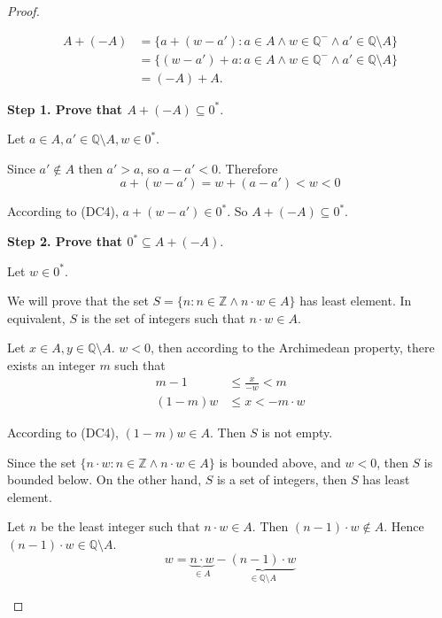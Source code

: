 \begin{proof}
\begin{enumerate}[label = (F\arabic*)]
\begin{align*}
                  A + (-A) & = \{ a + (w - a') : a\in A\land w\in\mathbb{Q}^{-}\land a'\in\mathbb{Q}\setminus A \} \\
                           & = \{ (w - a') + a : a\in A\land w\in\mathbb{Q}^{-}\land a'\in\mathbb{Q}\setminus A \} \\
                           & = (-A) + A.
              \end{align*}
              \par \textbf{Step 1. Prove that $A + (-A)\subseteq {0}^{*}$}.
              \par Let $a\in A, a'\in \mathbb{Q}\setminus A, w\in {0}^{*}$.
              \par Since $a'\notin A$ then $a' > a$, so $a - a' < 0$. Therefore
              \[
                  a + (w - a') = w + (a - a') < w < 0
              \]
              \par According to (DC4), $a + (w - a')\in {0}^{*}$. So $A + (-A) \subseteq {0}^{*}$.
              \bigskip
              \par \textbf{Step 2. Prove that ${0}^{*}\subseteq A + (-A)$}.
              \par Let $w\in {0}^{*}$.
              \par We will prove that the set $S = \{ n : n\in\mathbb{Z} \land n\cdot w\in A \}$ has least element. In equivalent, $S$ is the set of integers such that $n\cdot w\in A$.
              \par Let $x\in A, y\in\mathbb{Q}\setminus A$. $w < 0$, then according to the Archimedean property, there exists an integer $m$ such that
              \begin{align*}
                  m - 1    & \le \frac{x}{-w} < m \\
                  (1 - m)w & \le x < -m\cdot w
              \end{align*}
              \par According to (DC4), $(1 - m)w\in A$. Then $S$ is not empty.
              \par Since the set $\{ n\cdot w : n\in\mathbb{Z}\land n\cdot w\in A \}$ is bounded above, and $w < 0$, then $S$ is bounded below. On the other hand, $S$ is a set of integers, then $S$ has least element.
              \par
              \par Let $n$ be the least integer such that $n\cdot w\in A$. Then $(n - 1)\cdot w\notin A$. Hence $(n - 1)\cdot w\in\mathbb{Q}\setminus A$.
              \[
                  w = \underbrace{n\cdot w}_{\in A} - \underbrace{(n - 1)\cdot w}_{\in\mathbb{Q}\setminus A}
\]
\end{enumerate}
\end{proof}
